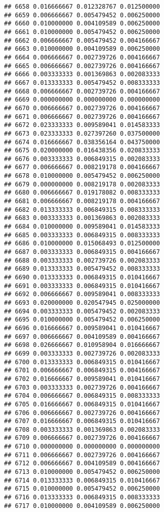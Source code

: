 \documentclass[
]{article}
\begin{document}
\begin{verbatim}
## 6658 0.016666667 0.012328767 0.012500000
## 6659 0.006666667 0.005479452 0.006250000
## 6660 0.010000000 0.004109589 0.006250000
## 6661 0.010000000 0.005479452 0.006250000
## 6662 0.006666667 0.005479452 0.004166667
## 6663 0.010000000 0.004109589 0.006250000
## 6664 0.006666667 0.002739726 0.004166667
## 6665 0.006666667 0.002739726 0.004166667
## 6666 0.003333333 0.001369863 0.002083333
## 6667 0.013333333 0.005479452 0.008333333
## 6668 0.006666667 0.002739726 0.004166667
## 6669 0.000000000 0.000000000 0.000000000
## 6670 0.006666667 0.002739726 0.004166667
## 6671 0.006666667 0.002739726 0.004166667
## 6672 0.023333333 0.009589041 0.014583333
## 6673 0.023333333 0.027397260 0.037500000
## 6674 0.016666667 0.038356164 0.043750000
## 6675 0.020000000 0.016438356 0.020833333
## 6676 0.003333333 0.006849315 0.002083333
## 6677 0.006666667 0.008219178 0.004166667
## 6678 0.010000000 0.005479452 0.006250000
## 6679 0.000000000 0.008219178 0.002083333
## 6680 0.006666667 0.019178082 0.008333333
## 6681 0.006666667 0.008219178 0.004166667
## 6682 0.013333333 0.006849315 0.008333333
## 6683 0.003333333 0.001369863 0.002083333
## 6684 0.010000000 0.009589041 0.014583333
## 6685 0.003333333 0.006849315 0.008333333
## 6686 0.010000000 0.015068493 0.012500000
## 6687 0.003333333 0.006849315 0.004166667
## 6688 0.003333333 0.002739726 0.002083333
## 6689 0.013333333 0.005479452 0.008333333
## 6690 0.013333333 0.006849315 0.010416667
## 6691 0.003333333 0.006849315 0.010416667
## 6692 0.006666667 0.009589041 0.008333333
## 6693 0.020000000 0.020547945 0.025000000
## 6694 0.003333333 0.005479452 0.002083333
## 6695 0.010000000 0.005479452 0.006250000
## 6696 0.016666667 0.009589041 0.010416667
## 6697 0.006666667 0.004109589 0.004166667
## 6698 0.026666667 0.010958904 0.016666667
## 6699 0.003333333 0.002739726 0.002083333
## 6700 0.013333333 0.006849315 0.010416667
## 6701 0.006666667 0.006849315 0.004166667
## 6702 0.016666667 0.009589041 0.010416667
## 6703 0.003333333 0.002739726 0.004166667
## 6704 0.006666667 0.006849315 0.008333333
## 6705 0.016666667 0.006849315 0.010416667
## 6706 0.006666667 0.002739726 0.004166667
## 6707 0.016666667 0.006849315 0.010416667
## 6708 0.003333333 0.001369863 0.002083333
## 6709 0.006666667 0.002739726 0.004166667
## 6710 0.000000000 0.000000000 0.000000000
## 6711 0.006666667 0.002739726 0.004166667
## 6712 0.006666667 0.004109589 0.004166667
## 6713 0.010000000 0.005479452 0.006250000
## 6714 0.013333333 0.006849315 0.010416667
## 6715 0.010000000 0.005479452 0.006250000
## 6716 0.013333333 0.006849315 0.008333333
## 6717 0.010000000 0.004109589 0.006250000

\end{verbatim}
\end{document}
